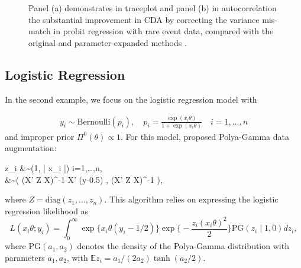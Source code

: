 \documentclass[twoside,11pt]{article}
\newcommand{\xtheta}{ x_i \theta}
\newcommand{\be}{\begin{equs}}
\newcommand{\ee}{\end{equs}}
\newcommand{\bb}[1]{\mathbb{#1}}
\newcommand{\No}{\text{No}}
\newcommand{\PG}{\text{PG}}
\newcommand{\Bern}{\text{Bernoulli}}
\newcommand{\diag}{\text{diag}}
\newcommand{\1}{\mathbf 1}
\begin{document}
\begin{figure}[H]
  {%
    \qquad
  }
 {\caption{Panel (a) demonstrates in traceplot and panel (b) in autocorrelation the substantial improvement in CDA by correcting the variance mis-match in probit regression with rare event data, compared with the original \citep{albert1993bayesian} and parameter-expanded methods \citep{liu1999parameter}.}}
\end{figure}


\subsection{Logistic Regression}
In the second example, we focus on the logistic regression model with 

\begin{equation}
\label{logit_regression}
	\begin{aligned}
    y_i \sim \Bern(p_i), \quad p_i = \frac{\exp(x_i \theta)}{1+\exp(x_i \theta)} \quad i=1,\ldots,n
	\end{aligned}
\end{equation}
and improper prior $\Pi^0(\theta) \propto 1$. For this model, \cite{polson2013bayesian} proposed Polya-Gamma data augmentation:
\be
 z_i &\sim {\PG}(1, |\xtheta|) \quad i=1,\ldots,n,\\
\theta &\sim \No \left(  (X' Z X)^{-1}   X'  (y-0.5)  ,  (X' Z X)^{-1}  \right),
\ee
where $Z= \diag(z_1,\ldots,z_n)$.  This algorithm relies on expressing the logistic regression likelihood as
$$L( \xtheta; y_i )=  \int_0^\infty \exp\{ \xtheta (y_i-1/2)\} \exp\bigg\{ -\frac{z_i (\xtheta)^2}{2}\bigg\} \PG(z_i \mid 1,0) dz_i,$$
where $\mbox{PG}(a_1,a_2)$ denotes the density of the Polya-Gamma distribution with parameters $a_1,a_2$, with $\bb{E}z_i= {a_1}/{(2 a_2)}\tanh({a_2}/{2})$.
\end{document}
